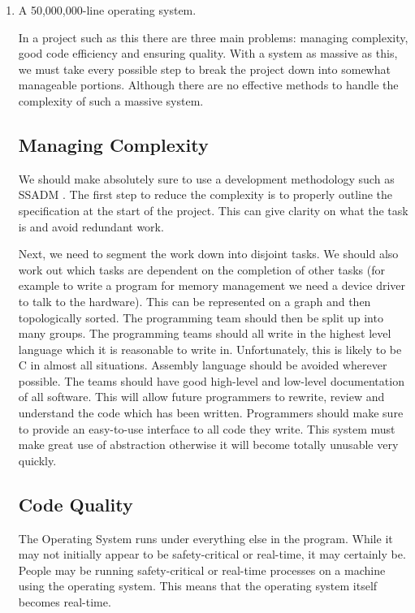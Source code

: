 \documentclass[10pt,\jkfside,a4paper]{article}
\begin{document}
\begin{enumerate}
\begin{enumerate}[label=(\alph*)]
\item A 50,000,000-line operating system.

In a project such as this there are three main problems: managing complexity, good code efficiency and ensuring
quality.
With a system as massive as this, we must take every possible step to break the project down into somewhat manageable
portions. Although there are no effective methods to handle the complexity of such a massive system.

\subsection*{Managing Complexity}

We should make absolutely sure to use a development methodology such as SSADM .
The first step to reduce the complexity is to properly outline the specification at the start of the project. This
can give clarity on what the task is and avoid redundant work.

Next, we need to segment the work down into disjoint tasks. We should also work out which tasks are dependent on the
completion of other tasks (for example to write a program for memory management we need a device driver to talk to the
hardware). This can be represented on a graph and then topologically sorted.
The programming team should then be split up into many groups.
The programming teams should all write in the highest level language which it is reasonable to write in.
Unfortunately, this is likely to be C in almost all situations. Assembly language should be avoided wherever possible.
The teams should have good high-level and low-level documentation of all software. This will allow future programmers
to rewrite, review and understand the code which has been written. Programmers should make sure to provide an
easy-to-use interface to all code they write. This system must make great use of abstraction otherwise it will become
totally unusable very quickly.

\subsection*{Code Quality}

The Operating System runs under everything else in the program. While it may not initially appear to be
safety-critical or real-time, it may certainly be. People may be running safety-critical or real-time processes on a
machine using the operating system. This means that the operating system itself becomes real-time.


\end{enumerate}
\end{enumerate}
\end{document}
